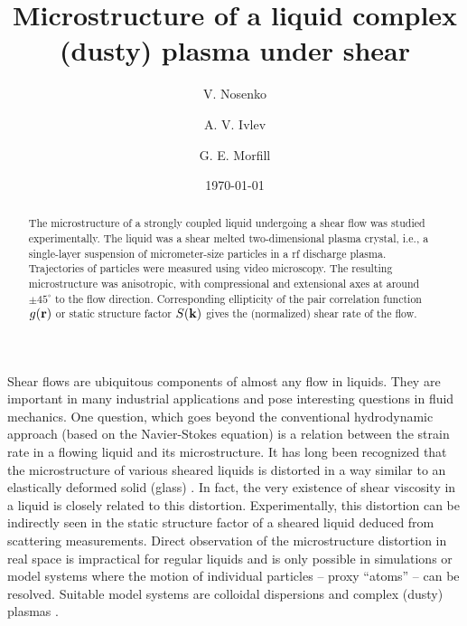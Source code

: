 \documentclass[aps,prl,twocolumn,showpacs,groupedaddress,amssymb]{revtex4}
\begin{document}
\title{Microstructure of a liquid complex (dusty) plasma under shear}

\author{V. Nosenko}
\author{A. V. Ivlev}
\author{G. E. Morfill}

\date{\today}
\begin{abstract}
The microstructure of a strongly coupled liquid undergoing a shear flow was studied experimentally. The liquid was a shear melted two-dimensional plasma crystal, i.e., a single-layer suspension of micrometer-size particles in a rf discharge plasma. Trajectories of particles were measured using video microscopy. The resulting microstructure was anisotropic, with compressional and extensional axes at around $\pm 45^{\circ}$ to the flow direction. Corresponding ellipticity of the pair correlation function $g({\bf r})$ or static structure factor $S(\bf{k})$ gives the (normalized) shear rate of the flow.
\end{abstract}
 \maketitle

Shear flows are ubiquitous components of almost any flow in liquids. They are important in many industrial applications and pose interesting questions in fluid mechanics. One question, which goes beyond the conventional hydrodynamic approach (based on the Navier-Stokes equation) is a relation between the strain rate in a flowing liquid and its microstructure. It has long been recognized that the microstructure of various sheared liquids is distorted in a way similar to an elastically deformed solid (glass) \cite{Clark:80,Hanley:83,Henrich:09,Fuchs:09,Brader:10}. In fact, the very existence of shear viscosity in a liquid is closely related to this distortion. Experimentally, this distortion can be indirectly seen in the static structure factor of a sheared liquid deduced from scattering measurements. Direct observation of the microstructure distortion in real space is impractical for regular liquids and is only possible in simulations or model systems where the motion of individual particles -- proxy ``atoms'' -- can be resolved. Suitable model systems are colloidal dispersions \cite{Clark:80,Hanley:83,Fuchs:09,Brader:10} and complex (dusty) plasmas \cite{Morfill:09,ShuklaBook}.
\end{document}
